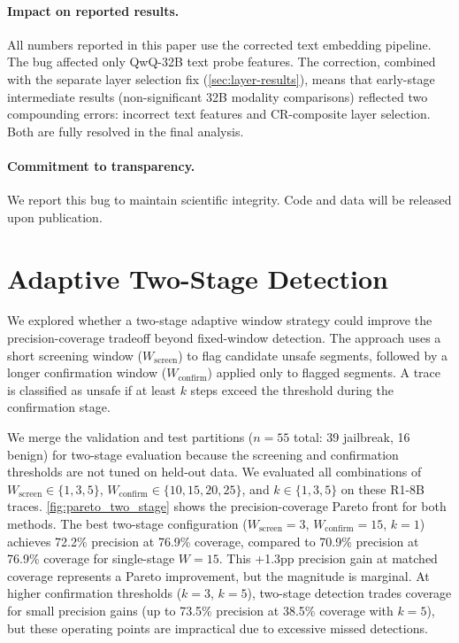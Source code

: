 \paragraph{Impact on reported results.} All numbers reported in this paper use the corrected text embedding pipeline. The bug affected only QwQ-32B text probe features. The correction, combined with the separate layer selection fix (\cref{sec:layer-results}), means that early-stage intermediate results (non-significant 32B modality comparisons) reflected two compounding errors: incorrect text features and CR-composite layer selection. Both are fully resolved in the final analysis.

\paragraph{Commitment to transparency.} We report this bug to maintain scientific integrity. Code and data will be released upon publication.

\section{Adaptive Two-Stage Detection}
\label{app:two_stage}

We explored whether a two-stage adaptive window strategy could improve the precision-coverage tradeoff beyond fixed-window detection. The approach uses a short screening window ($W_{\text{screen}}$) to flag candidate unsafe segments, followed by a longer confirmation window ($W_{\text{confirm}}$) applied only to flagged segments. A trace is classified as unsafe if at least $k$ steps exceed the threshold during the confirmation stage.

We merge the validation and test partitions ($n{=}55$ total: 39 jailbreak, 16 benign) for two-stage evaluation because the screening and confirmation thresholds are not tuned on held-out data. We evaluated all combinations of $W_{\text{screen}} \in \{1, 3, 5\}$, $W_{\text{confirm}} \in \{10, 15, 20, 25\}$, and $k \in \{1, 3, 5\}$ on these R1-8B traces. \cref{fig:pareto_two_stage} shows the precision-coverage Pareto front for both methods. The best two-stage configuration ($W_{\text{screen}}{=}3$, $W_{\text{confirm}}{=}15$, $k{=}1$) achieves 72.2\% precision at 76.9\% coverage, compared to 70.9\% precision at 76.9\% coverage for single-stage $W{=}15$. This +1.3pp precision gain at matched coverage represents a Pareto improvement, but the magnitude is marginal. At higher confirmation thresholds ($k{=}3$, $k{=}5$), two-stage detection trades coverage for small precision gains (up to 73.5\% precision at 38.5\% coverage with $k{=}5$), but these operating points are impractical due to excessive missed detections.

